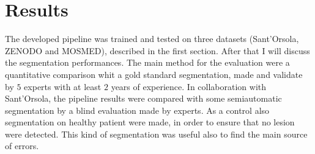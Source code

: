 \documentclass{standalone}
\begin{document}
	\chapter{Results}
	

	The developed pipeline was trained and tested on three datasets (Sant'Orsola, ZENODO and MOSMED), described in the first section. 
	After that I will discuss the segmentation performances. The main method for the evaluation were a quantitative comparison whit a gold standard segmentation, made and validate by $5$ experts with at least $2$ years of experience. In collaboration with Sant'Orsola, the pipeline results were compared with some semiautomatic segmentation by a blind evaluation made by experts.
	As a control also segmentation on healthy patient were made, in order to ensure that no lesion were detected. This kind of segmentation was useful also to find the main source of errors. 
\end{document}

